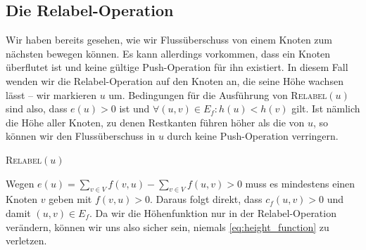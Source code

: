 \documentclass[12pt,a4paper,titlepage,onecolumn,ngerman,bibliography=totocnumbered]{scrartcl}
\theoremstyle{definition}
\theoremstyle{remark}
\begin{document}
\subsection{Die Relabel-Operation}
Wir haben bereits gesehen, wie wir Flussüberschuss von einem Knoten zum nächsten bewegen können.
Es kann allerdings vorkommen, dass ein Knoten überflutet ist und keine gültige Push-Operation für ihn existiert.
In diesem Fall wenden wir die Relabel-Operation auf den Knoten an, die seine Höhe wachsen lässt -- wir markieren $u$ um.
Bedingungen für die Ausführung von \textsc{Relabel}$(u)$ sind also, dass $e(u) > 0$ ist und $\forall (u,v)\in E_f: h(u) < h(v)$ gilt.
Ist nämlich die Höhe aller Knoten, zu denen Restkanten führen höher als die von $u$, so können wir den Flussüberschuss in $u$ durch keine Push-Operation verringern.
\begin{algorithm}[H]
    \caption{\textsc{Relabel}$(u)$}
    \label{alg:relabel}
\begin{algorithmic}[1]
\State{}
\end{algorithmic}
\end{algorithm}
Wegen $e(u) = \sum_{v\in V}f(v,u) -\sum_{v\in V}f(u,v) > 0$ muss es mindestens einen Knoten $v$ geben mit $f(v,u) > 0$.
Daraus folgt direkt, dass $c_f(u,v) > 0$ und damit $(u,v)\in E_f$.
Da wir die Höhenfunktion nur in der Relabel-Operation verändern, können wir uns also sicher sein, niemals \eqref{eq:height_function} zu verletzen.
\end{document}
